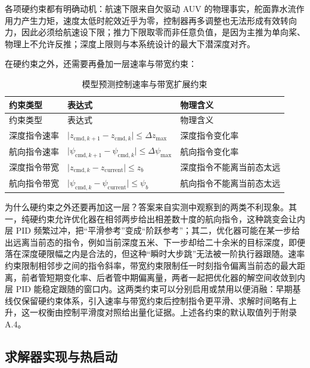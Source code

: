 各项硬约束都有明确动机：航速下限来自欠驱动 AUV 的物理事实，舵面靠水流作用力产生力矩，速度太低时舵效近乎为零，控制器再多调整也无法形成有效转向力，因此必须给航速设下限；推力下限取零而非任意负值，是因为主推为单向桨、物理上不允许反推；深度上限则与本系统设计的最大下潜深度对齐。

在硬约束之外，还需要再叠加一层速率与带宽约束：

\begin{longtable}[]{@{}
  >{\raggedright\arraybackslash}p{}
  >{\raggedright\arraybackslash}p{}
  >{\raggedright\arraybackslash}p{}@{}}
\caption{模型预测控制速率与带宽扩展约束}\label{tab:ch04-rate-band-constraints}\tabularnewline
\toprule\noalign{}
约束类型 & 表达式 & 物理含义 \\
\midrule\noalign{}
\endfirsthead
\toprule\noalign{}
约束类型 & 表达式 & 物理含义 \\
\midrule\noalign{}
\endhead
\bottomrule\noalign{}
\endlastfoot
深度指令速率 & \(\lvert z_{\mathrm{cmd},k+1}-z_{\mathrm{cmd},k}\rvert\le\Delta z_{\max}\) & 深度指令变化率 \\
航向指令速率 & \(\lvert\psi_{\mathrm{cmd},k+1}-\psi_{\mathrm{cmd},k}\rvert\le\Delta\psi_{\max}\) & 航向指令变化率 \\
深度指令带宽 & \(\lvert z_{\mathrm{cmd},k}-z_{\mathrm{current}}\rvert\le z_b\) & 深度指令不能离当前态太远 \\
航向指令带宽 & \(\lvert\psi_{\mathrm{cmd},k}-\psi_{\mathrm{current}}\rvert\le\psi_b\) & 航向指令不能离当前态太远 \\
\end{longtable}

为什么硬约束之外还要再加这一层？答案来自实测中观察到的两类不利现象。其一，纯硬约束允许优化器在相邻两步给出相差数十度的航向指令，这种跳变会让内层 PID 频繁过冲，把``平滑参考''变成``阶跃参考''；其二，优化器可能在某一步给出远离当前态的指令，例如当前深度五米、下一步却给二十余米的目标深度，即便落在深度硬限幅之内是合法的，但这种``瞬时大步跳''无法被一阶执行器跟随。速率约束限制相邻步之间的指令斜率，带宽约束限制任一时刻指令偏离当前态的最大距离，前者管短期变化率、后者管中期偏离量，两者一起把优化器的解空间收敛到内层 PID 能稳定跟随的窗口内。这两类约束可以分别启用或禁用以便消融：早期基线仅保留硬约束体系，引入速率与带宽约束后控制指令更平滑、求解时间略有上升，这一权衡由控制平滑度对照给出量化证据。上述各约束的默认取值列于附录 A.4。

\subsection{求解器实现与热启动}\label{sec:ch04-4-4-6}

